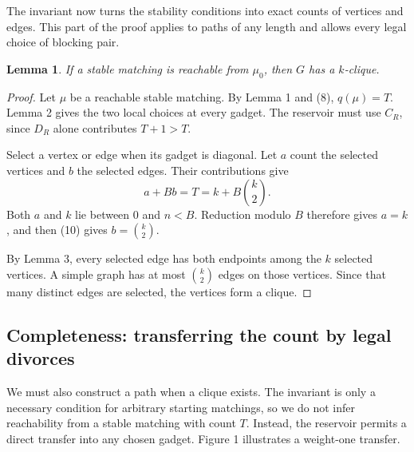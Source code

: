 \documentclass[11pt,letterpaper]{article}
\newtheorem{lemma}{Lemma}
\theoremstyle{definition}
\begin{document}
The invariant now turns the stability conditions into exact counts of vertices and edges. This part of the proof applies to paths of any length and allows every legal choice of blocking pair.

\begin{lemma}
If a stable matching is reachable from $\mu_0$, then $G$ has a $k$-clique.
\end{lemma}
\begin{proof}
Let $\mu$ be a reachable stable matching. By Lemma 1 and (8), $q(\mu)=T$. Lemma 2 gives the two local choices at every gadget. The reservoir must use $C_R$, since $D_R$ alone contributes $T+1>T$.

Select a vertex or edge when its gadget is diagonal. Let $a$ count the selected vertices and $b$ the selected edges. Their contributions give
\begin{equation}\tag{10}
a+Bb=T=k+B\binom{k}{2}.
\end{equation}
Both $a$ and $k$ lie between $0$ and $n<B$. Reduction modulo $B$ therefore gives $a=k$, and then (10) gives $b=\binom{k}{2}$.

By Lemma 3, every selected edge has both endpoints among the $k$ selected vertices. A simple graph has at most $\binom{k}{2}$ edges on those vertices. Since that many distinct edges are selected, the vertices form a clique.
\end{proof}

\subsection{Completeness: transferring the count by legal divorces}

We must also construct a path when a clique exists. The invariant is only a necessary condition for arbitrary starting matchings, so we do not infer reachability from a stable matching with count $T$. Instead, the reservoir permits a direct transfer into any chosen gadget. Figure 1 illustrates a weight-one transfer.
\end{document}
